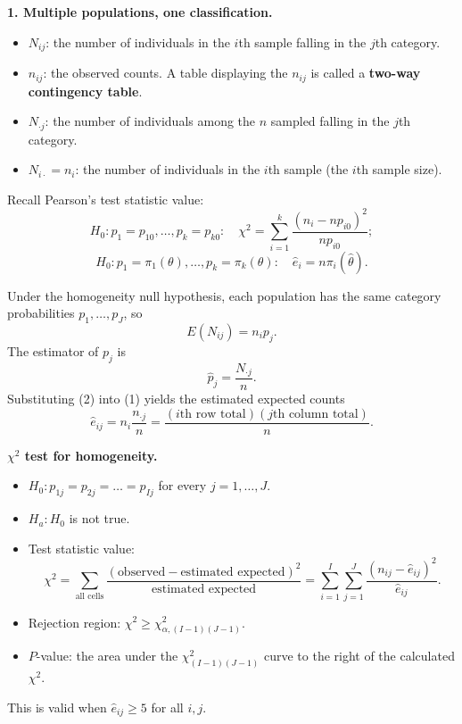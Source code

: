 \textbf{1. Multiple populations, one classification.}
\begin{itemize}
  \item $N_{ij}$: the number of individuals in the $i$th sample falling in the $j$th category.
  \item $n_{ij}$: the observed counts. A table displaying the $n_{ij}$ is called a \textbf{two-way contingency table}.
  \item $N_{\cdot j}$: the number of individuals among the $n$ sampled falling in the $j$th category.
  \item $N_{i\cdot}=n_i$: the number of individuals in the $i$th sample (the $i$th sample size).
\end{itemize}

Recall Pearson's test statistic value:
\[
H_0:p_1=p_{10},\dots,p_k=p_{k0}:\quad \chi^2=\sum_{i=1}^k\frac{(n_i-np_{i0})^2}{np_{i0}};
\]
\[
H_0:p_1=\pi_1(\theta),\dots,p_k=\pi_k(\theta):\quad \hat{e}_i=n\pi_i(\hat\theta).
\]

Under the homogeneity null hypothesis, each population has the same category probabilities $p_1,\dots,p_J$, so
\[
E(N_{ij}) = n_ip_j. \tag{1}
\]
The estimator of $p_j$ is
\[
\hat{p}_j = \frac{N_{\cdot j}}{n}. \tag{2}
\]
Substituting (2) into (1) yields the estimated expected counts
\[
\hat{e}_{ij} = n_i\frac{n_{\cdot j}}{n} = \frac{(i\text{th row total})(j\text{th column total})}{n}.
\]

\textbf{$\chi^2$ test for homogeneity.}
\begin{itemize}
  \item $H_0: p_{1j}=p_{2j}=\dots=p_{Ij}$ for every $j=1,\dots,J$.
  \item $H_a: H_0$ is not true.
  \item Test statistic value:
  \[
  \chi^2=\sum_{\text{all cells}}\frac{(\text{observed}-\text{estimated expected})^2}{\text{estimated expected}}
  =\sum_{i=1}^I\sum_{j=1}^J\frac{(n_{ij}-\hat{e}_{ij})^2}{\hat{e}_{ij}} .
  \]
  \item Rejection region: $\chi^2\ge\chi^2_{\alpha,(I-1)(J-1)}$.
  \item $P$-value: the area under the $\chi^2_{(I-1)(J-1)}$ curve to the right of the calculated $\chi^2$.
\end{itemize}
This is valid when $\hat{e}_{ij}\ge5$ for all $i,j$.

